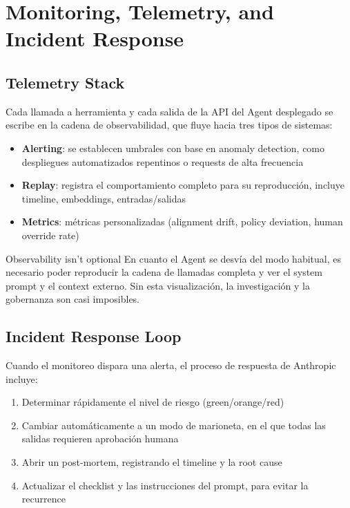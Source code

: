 \section{Monitoring, Telemetry, and Incident Response}

\subsection{Telemetry Stack}

Cada llamada a herramienta y cada salida de la API del Agent desplegado se escribe en la cadena de observabilidad, que fluye hacia tres tipos de sistemas:

\begin{itemize}
    \item \textbf{Alerting}: se establecen umbrales con base en anomaly detection, como despliegues automatizados repentinos o requests de alta frecuencia
    \item \textbf{Replay}: registra el comportamiento completo para su reproducción, incluye timeline, embeddings, entradas/salidas
    \item \textbf{Metrics}: métricas personalizadas (alignment drift, policy deviation, human override rate)
\end{itemize}

\begin{warningbox}{Observability isn't optional}
En cuanto el Agent se desvía del modo habitual, es necesario poder reproducir la cadena de llamadas completa y ver el system prompt y el context externo. Sin esta visualización, la investigación y la gobernanza son casi imposibles.
\end{warningbox}

\subsection{Incident Response Loop}

Cuando el monitoreo dispara una alerta, el proceso de respuesta de Anthropic incluye:

\begin{enumerate}
    \item Determinar rápidamente el nivel de riesgo (green/orange/red)
    \item Cambiar automáticamente a un modo de marioneta, en el que todas las salidas requieren aprobación humana
    \item Abrir un post-mortem, registrando el timeline y la root cause
    \item Actualizar el checklist y las instrucciones del prompt, para evitar la recurrence
\end{enumerate}

